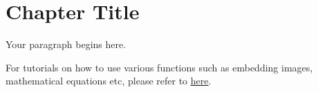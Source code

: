 \section*{Chapter Title}
Your paragraph begins here.

For tutorials on how to use various functions such as embedding images, mathematical equations etc, please refer to \href{https://overleaf.com/learn}{\underline{here}}.